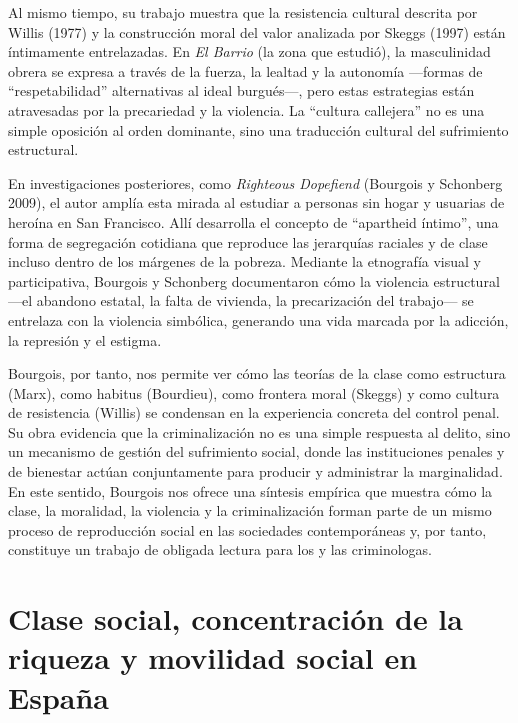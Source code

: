 \documentclass[
  spanish,
  letterpaper,
  DIV=11,
  numbers=noendperiod]{scrreprt}
\begin{document}
\begin{tcolorbox}
Al mismo tiempo, su trabajo muestra que la resistencia cultural descrita
por Willis (1977) y la construcción moral del valor analizada por Skeggs
(1997) están íntimamente entrelazadas. En \emph{El Barrio} (la zona que
estudió), la masculinidad obrera se expresa a través de la fuerza, la
lealtad y la autonomía ---formas de ``respetabilidad'' alternativas al
ideal burgués---, pero estas estrategias están atravesadas por la
precariedad y la violencia. La ``cultura callejera'' no es una simple
oposición al orden dominante, sino una traducción cultural del
sufrimiento estructural.

En investigaciones posteriores, como \emph{Righteous Dopefiend}
(Bourgois y Schonberg 2009), el autor amplía esta mirada al estudiar a
personas sin hogar y usuarias de heroína en San Francisco. Allí
desarrolla el concepto de ``apartheid íntimo'', una forma de segregación
cotidiana que reproduce las jerarquías raciales y de clase incluso
dentro de los márgenes de la pobreza. Mediante la etnografía visual y
participativa, Bourgois y Schonberg documentaron cómo la violencia
estructural ---el abandono estatal, la falta de vivienda, la
precarización del trabajo--- se entrelaza con la violencia simbólica,
generando una vida marcada por la adicción, la represión y el estigma.

Bourgois, por tanto, nos permite ver cómo las teorías de la clase como
estructura (Marx), como habitus (Bourdieu), como frontera moral (Skeggs)
y como cultura de resistencia (Willis) se condensan en la experiencia
concreta del control penal. Su obra evidencia que la criminalización no
es una simple respuesta al delito, sino un mecanismo de gestión del
sufrimiento social, donde las instituciones penales y de bienestar
actúan conjuntamente para producir y administrar la marginalidad. En
este sentido, Bourgois nos ofrece una síntesis empírica que muestra cómo
la clase, la moralidad, la violencia y la criminalización forman parte
de un mismo proceso de reproducción social en las sociedades
contemporáneas y, por tanto, constituye un trabajo de obligada lectura
para los y las criminologas.

\end{tcolorbox}

\section{Clase social, concentración de la riqueza y movilidad social en
España}\label{clase-social-concentraciuxf3n-de-la-riqueza-y-movilidad-social-en-espauxf1a}
\end{document}
